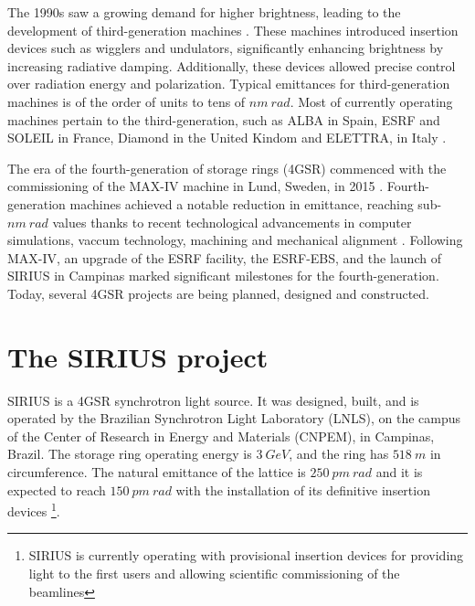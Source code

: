 The 1990s saw a growing demand for higher brightness, leading to the development of third-generation machines \cite{liu_towards_2017}. These machines introduced insertion devices such as wigglers and undulators, significantly enhancing brightness by increasing radiative damping. Additionally, these devices allowed precise control over radiation energy and polarization. Typical emittances for third-generation machines is of the order of units to tens of $\unit{nm}~\unit{rad}$. Most of currently operating machines pertain to the third-generation, such as ALBA in Spain, ESRF and SOLEIL in France, Diamond in the United Kindom and ELETTRA, in Italy \cite{simoulin_synchrotron_2016}.

The era of the fourth-generation of storage rings (4GSR) commenced with the commissioning of the MAX-IV machine in Lund, Sweden, in 2015 \cite{liu_towards_2017,hettel_challenges_2014}. Fourth-generation machines achieved a notable reduction in emittance, reaching sub-$\unit{nm}~\unit{rad}$ values thanks to recent technological advancements in computer simulations, vaccum technology, machining and mechanical alignment \cite{hettel_challenges_2014,liu_towards_2017}. Following MAX-IV, an upgrade of the ESRF facility, the ESRF-EBS, and the launch of SIRIUS in Campinas marked significant milestones for the fourth-generation. Today, several 4GSR projects are being planned, designed and constructed.

\section{The SIRIUS project}
SIRIUS is a 4GSR synchrotron light source. It was designed, built, and is operated by the Brazilian Synchrotron Light Laboratory (LNLS), on the campus of the Center of Research in Energy and Materials (CNPEM), in Campinas, Brazil. The storage ring operating energy is $3~\unit{GeV}$, and the ring has $518~\unit{m}$ in circumference. The natural emittance of the lattice is $250~\unit{pm}~\unit{rad}$ and it is expected to reach $150~\unit{pm}~\unit{rad}$ with the installation of its definitive insertion devices \cite{liu_synchrotron_2019}\footnote{SIRIUS is currently operating with provisional insertion devices for providing light to the first users and allowing scientific commissioning of the beamlines}.

